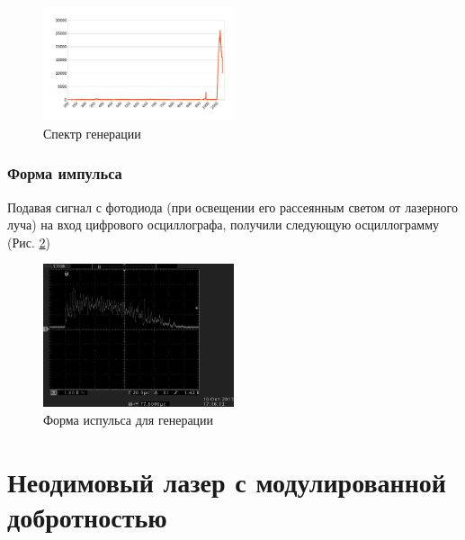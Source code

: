 \documentclass[twocolumn]{article}
\begin{document}
  
    
     
    \begin{figure}
	\centering
    \includegraphics[width=0.5\textwidth]{LEMPH Report_files/LEMPH Report_26_0.jpeg}
    \caption{Спектр генерации \label{fig:generation_spectrum}}
    \end{figure}
    
            
        
    
\subsubsection{Форма импульса}
Подавая сигнал с фотодиода (при освещении его рассеянным светом от
лазерного луча) на вход цифрового осциллографа, получили следующую
осциллограмму (Рис. \ref{fig:laser_pulse})

    
      
    \begin{figure}
    \includegraphics[width=0.5\textwidth]{LEMPH Report_files/LEMPH Report_29_0.jpeg}
    \caption{Форма испульса для генерации \label{fig:laser_pulse}}
    \end{figure}
    
         
            
        
    
\section{Неодимовый лазер с модулированной добротностью}
\end{document}
